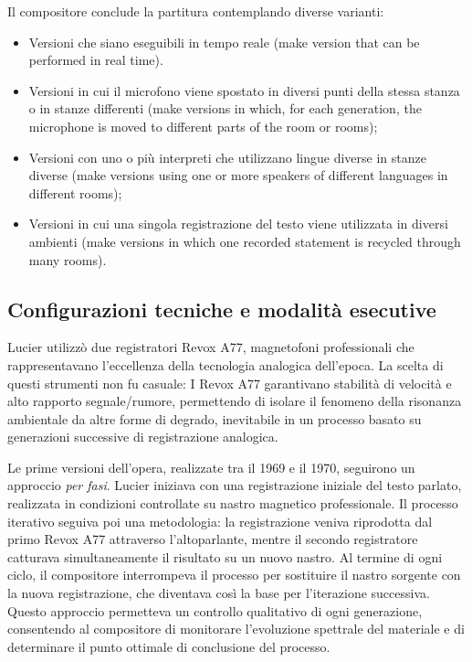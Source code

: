 Il compositore conclude la partitura contemplando diverse varianti:

\begin{itemize}
    \item Versioni che siano eseguibili in tempo reale (make version that can be performed in real time).
\end{itemize}

\begin{itemize}
    \item Versioni in cui il microfono viene spostato in diversi punti della stessa stanza o in stanze differenti (make versions in which, for each generation, the microphone is moved to different parts of the room or rooms);
\end{itemize}

\begin{itemize}
    \item Versioni con uno o più interpreti che utilizzano lingue diverse in stanze diverse (make versions using one or more speakers of different languages in different rooms);
\end{itemize}

\begin{itemize}
    \item Versioni in cui una singola registrazione del testo viene utilizzata in diversi ambienti (make versions in which one recorded statement is recycled through many rooms).
\end{itemize}

\subsection{Configurazioni tecniche e modalità esecutive}

Lucier utilizzò due registratori Revox A77, magnetofoni professionali che rappresentavano l'eccellenza della tecnologia analogica dell'epoca. La scelta di questi strumenti non fu casuale: I Revox A77 garantivano stabilità di velocità e alto rapporto segnale/rumore, permettendo di isolare il fenomeno della risonanza ambientale da altre forme di degrado, inevitabile in un processo basato su generazioni successive di registrazione analogica.

Le prime versioni dell'opera, realizzate tra il 1969 e il 1970, seguirono un approccio \textit{per fasi}. Lucier iniziava con una registrazione iniziale del testo parlato, realizzata in condizioni controllate su nastro magnetico professionale. Il processo iterativo seguiva poi una metodologia: la registrazione veniva riprodotta dal primo Revox A77 attraverso l'altoparlante, mentre il secondo registratore catturava simultaneamente il risultato su un nuovo nastro. Al termine di ogni ciclo, il compositore interrompeva il processo per sostituire il nastro sorgente con la nuova registrazione, che diventava così la base per l'iterazione successiva. Questo approccio permetteva un controllo qualitativo di ogni generazione, consentendo al compositore di monitorare l'evoluzione spettrale del materiale e di determinare il punto ottimale di conclusione del processo.

